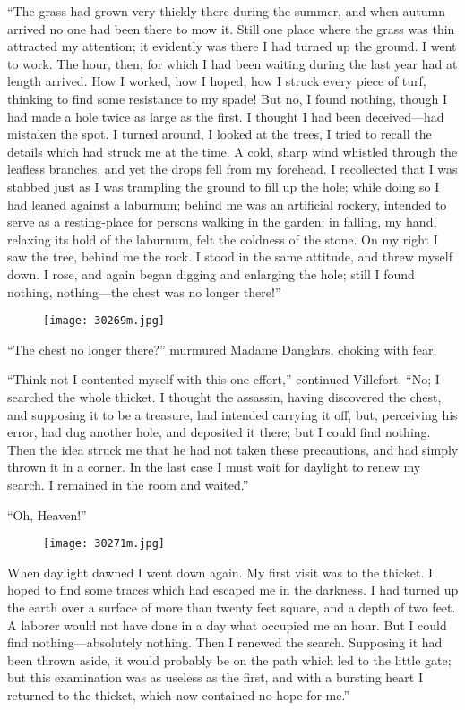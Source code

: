 “The grass had grown very thickly there during the summer, and when
autumn arrived no one had been there to mow it. Still one place where
the grass was thin attracted my attention; it evidently was there I had
turned up the ground. I went to work. The hour, then, for which I had
been waiting during the last year had at length arrived. How I worked,
how I hoped, how I struck every piece of turf, thinking to find some
resistance to my spade! But no, I found nothing, though I had made a
hole twice as large as the first. I thought I had been deceived—had
mistaken the spot. I turned around, I looked at the trees, I tried to
recall the details which had struck me at the time. A cold, sharp wind
whistled through the leafless branches, and yet the drops fell from my
forehead. I recollected that I was stabbed just as I was trampling the
ground to fill up the hole; while doing so I had leaned against a
laburnum; behind me was an artificial rockery, intended to serve as a
resting-place for persons walking in the garden; in falling, my hand,
relaxing its hold of the laburnum, felt the coldness of the stone. On
my right I saw the tree, behind me the rock. I stood in the same
attitude, and threw myself down. I rose, and again began digging and
enlarging the hole; still I found nothing, nothing—the chest was no
longer there!”

\begin{figure}[ht]
\texttt{[image: 30269m.jpg]}
\end{figure}

“The chest no longer there?” murmured Madame Danglars, choking with
fear.

“Think not I contented myself with this one effort,” continued
Villefort. “No; I searched the whole thicket. I thought the assassin,
having discovered the chest, and supposing it to be a treasure, had
intended carrying it off, but, perceiving his error, had dug another
hole, and deposited it there; but I could find nothing. Then the idea
struck me that he had not taken these precautions, and had simply
thrown it in a corner. In the last case I must wait for daylight to
renew my search. I remained in the room and waited.”

“Oh, Heaven!”

\begin{figure}[ht]
\texttt{[image: 30271m.jpg]}
\end{figure}

When daylight dawned I went down again. My first visit was to the
thicket. I hoped to find some traces which had escaped me in the
darkness. I had turned up the earth over a surface of more than twenty
feet square, and a depth of two feet. A laborer would not have done in
a day what occupied me an hour. But I could find nothing—absolutely
nothing. Then I renewed the search. Supposing it had been thrown aside,
it would probably be on the path which led to the little gate; but this
examination was as useless as the first, and with a bursting heart I
returned to the thicket, which now contained no hope for me.”

